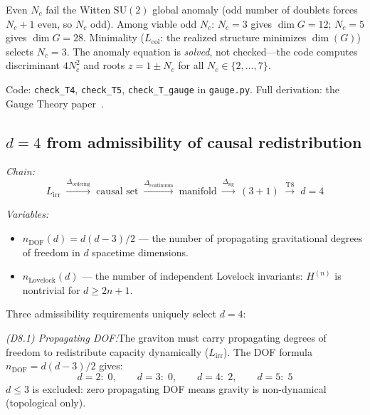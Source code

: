 \documentclass[11pt]{article}
\newcommand{\Lirr}{L_{\mathrm{irr}}}
\newcommand{\Lcol}{L_{\mathrm{col}}}
\newcommand{\SU}{\mathrm{SU}}
\begin{document}
Even $N_c$ fail the Witten $\SU(2)$ global anomaly (odd number of doublets forces $N_c + 1$ even, so $N_c$ odd).  Among viable odd $N_c$: $N_c = 3$ gives $\dim G = 12$; $N_c = 5$ gives $\dim G = 28$.  Minimality ($\Lcol$: the realized structure minimizes $\dim(G)$) selects $N_c = 3$.  The anomaly equation is \emph{solved}, not checked---the code computes discriminant $4N_c^2$ and roots $z = 1 \pm N_c$ for all $N_c \in \{2,\ldots,7\}$.

Code: \texttt{check\_T4}, \texttt{check\_T5}, \texttt{check\_T\_gauge} in \texttt{gauge.py}.  Full derivation: the Gauge Theory paper~\cite{PGT}.


\subsection{\texorpdfstring{$d=4$}{d=4} from admissibility of causal redistribution}

\begin{tcolorbox}[apfbox, title={T8: Spacetime Dimension $d = 4$ from Three Admissibility Filters}]
\textit{Chain:}
\begin{equation}
\Lirr \;\xrightarrow{\Delta_{\mathrm{ordering}}}\; \text{causal set} \;\xrightarrow{\Delta_{\mathrm{continuum}}}\; \text{manifold} \;\xrightarrow{\Delta_{\mathrm{sig}}}\; (3{+}1) \;\xrightarrow{\text{T8}}\; d=4
\end{equation}

\smallskip\noindent\textit{Variables:}
\begin{itemize}[nosep,leftmargin=2em]
\item $n_{\mathrm{DOF}}(d) = d(d-3)/2$ --- the number of propagating gravitational degrees of freedom in $d$ spacetime dimensions.
\item $n_{\mathrm{Lovelock}}(d)$ --- the number of independent Lovelock invariants: $H^{(n)}$ is nontrivial for $d \ge 2n + 1$.
\end{itemize}
\end{tcolorbox}

Three admissibility requirements uniquely select $d = 4$:

\textit{(D8.1) Propagating DOF:}\quad The graviton must carry propagating degrees of freedom to redistribute capacity dynamically ($\Lirr$).  The DOF formula $n_{\mathrm{DOF}} = d(d-3)/2$ gives:
\begin{equation}
d = 2:\; 0, \qquad d = 3:\; 0, \qquad d = 4:\; 2, \qquad d = 5:\; 5
\end{equation}
$d \le 3$ is excluded: zero propagating DOF means gravity is non-dynamical (topological only).
\end{document}
